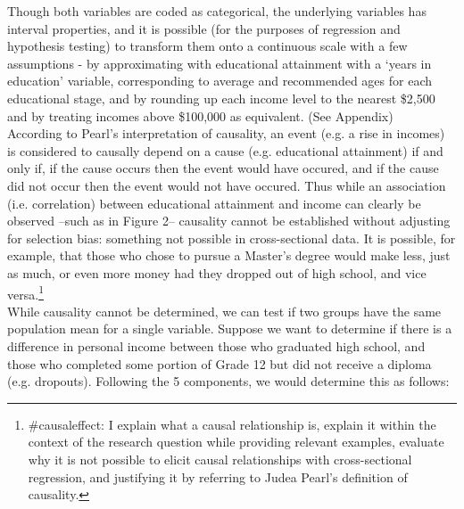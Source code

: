 \documentclass{article}
\begin{document}

Though both variables are coded as categorical, the underlying variables has interval properties, and it is possible (for the purposes of regression and hypothesis testing) to transform them onto a continuous scale with a few assumptions - by approximating with educational attainment with a `years in education' variable, corresponding to average and recommended ages for each educational stage, and by rounding up each income level to the nearest \$2,500 and by treating incomes above \$100,000 as equivalent. (See Appendix)\\

According to Pearl's interpretation of causality, an event (e.g. a rise in incomes) is considered to causally depend on a cause (e.g. educational attainment) if and only if, if the cause occurs then the event would have occured, and if the cause did not occur then the event would not have occured. Thus while an association (i.e. correlation) between educational attainment and income can clearly be observed --such as in Figure 2-- causality cannot be established without adjusting for selection bias: something not possible in cross-sectional data. It is possible, for example, that those who chose to pursue a Master's degree would make less, just as much, or even more money had they dropped out of high school, and vice versa.\footnote{\#causaleffect: I explain what a causal relationship is, explain it within the context of the research question while providing relevant examples, evaluate why it is not possible to elicit causal relationships with cross-sectional regression, and justifying it by referring to Judea Pearl's definition of causality.}\\



While causality cannot be determined, we can test if two groups have the same population mean for a single variable. Suppose we want to determine if there is a difference in personal income between those who graduated high school, and those who completed some portion of Grade 12 but did not receive a diploma (e.g. dropouts). Following the 5 components, we would determine this as follows:
\end{document}
